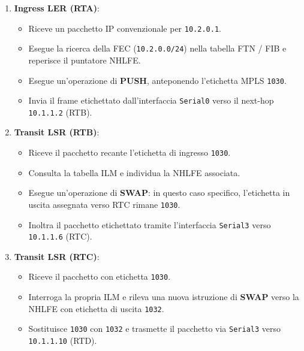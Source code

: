 \documentclass[11pt, a4paper]{article}
\begin{document}
\begin{enumerate}
    \item \textbf{Ingress LER (RTA)}:
    \begin{itemize}[noitemsep]
        \item Riceve un pacchetto IP convenzionale per \texttt{10.2.0.1}.
        \item Esegue la ricerca della FEC (\texttt{10.2.0.0/24}) nella tabella FTN / FIB e reperisce il puntatore NHLFE.
        \item Esegue un'operazione di \textbf{PUSH}, anteponendo l'etichetta MPLS \texttt{1030}.
        \item Invia il frame etichettato dall'interfaccia \texttt{Serial0} verso il next-hop \texttt{10.1.1.2} (RTB).
    \end{itemize}

    \item \textbf{Transit LSR (RTB)}:
    \begin{itemize}[noitemsep]
        \item Riceve il pacchetto recante l'etichetta di ingresso \texttt{1030}.
        \item Consulta la tabella ILM e individua la NHLFE associata.
        \item Esegue un'operazione di \textbf{SWAP}: in questo caso specifico, l'etichetta in uscita assegnata verso RTC rimane \texttt{1030}.
        \item Inoltra il pacchetto etichettato tramite l'interfaccia \texttt{Serial3} verso \texttt{10.1.1.6} (RTC).
    \end{itemize}

    \item \textbf{Transit LSR (RTC)}:
    \begin{itemize}[noitemsep]
        \item Riceve il pacchetto con etichetta \texttt{1030}.
        \item Interroga la propria ILM e rileva una nuova istruzione di \textbf{SWAP} verso la NHLFE con etichetta di uscita \texttt{1032}.
        \item Sostituisce \texttt{1030} con \texttt{1032} e trasmette il pacchetto via \texttt{Serial3} verso \texttt{10.1.1.10} (RTD).
    \end{itemize}


\end{enumerate}
\end{document}
